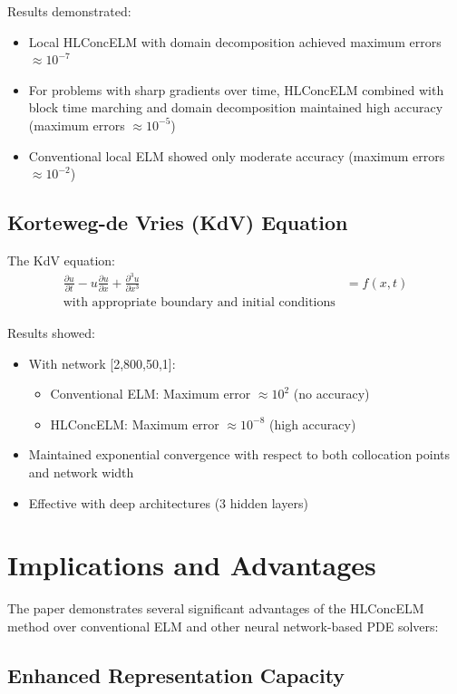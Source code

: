 \documentclass[11pt,a4paper]{article}
\begin{document}
Results demonstrated:
\begin{itemize}
    \item Local HLConcELM with domain decomposition achieved maximum errors $\approx 10^{-7}$
    \item For problems with sharp gradients over time, HLConcELM combined with block time marching and domain decomposition maintained high accuracy (maximum errors $\approx 10^{-5}$)
    \item Conventional local ELM showed only moderate accuracy (maximum errors $\approx 10^{-2}$)
\end{itemize}

\subsection{Korteweg-de Vries (KdV) Equation}

The KdV equation:
\begin{align}
\frac{\partial u}{\partial t} - u\frac{\partial u}{\partial x} + \frac{\partial^3 u}{\partial x^3} &= f(x,t) \\
\text{with appropriate boundary and initial conditions}
\end{align}

Results showed:
\begin{itemize}
    \item With network [2,800,50,1]:
        \begin{itemize}
            \item Conventional ELM: Maximum error $\approx 10^2$ (no accuracy)
            \item HLConcELM: Maximum error $\approx 10^{-8}$ (high accuracy)
        \end{itemize}
    \item Maintained exponential convergence with respect to both collocation points and network width
    \item Effective with deep architectures (3 hidden layers)
\end{itemize}

\section{Implications and Advantages}

The paper demonstrates several significant advantages of the HLConcELM method over conventional ELM and other neural network-based PDE solvers:

\subsection{Enhanced Representation Capacity}
\end{document}
